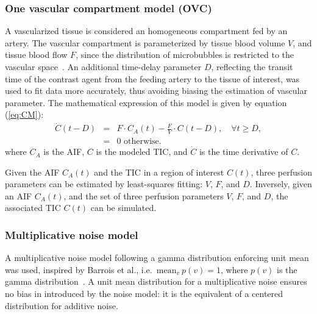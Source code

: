 \subsubsection{One vascular compartment model (OVC)}
\label{sec:OVCModel}
A vascularized tissue is considered an homogeneous compartment fed by an artery.
The vascular compartment is parameterized by tissue blood volume $V$, and tissue blood flow $F$, since the distribution of microbubbles is restricted to the vascular space~\cite{Gunn2001cx,Doury2016wn}.
An additional time-delay parameter $D$, reflecting the transit time of the contrast agent from the feeding artery to the tissue of interest, was used to fit data more accurately, thus avoiding biasing the estimation of vascular parameter. 
The mathematical expression of this model is given by equation (\ref{eq:CM}):
\begin{equation}
\begin{array}{rcl}
\dot{C} \left( t - D \right) &=& F \cdot C_A \left( t \right) - \frac{F}{V} \cdot C \left( t - D \right), \quad \forall t \geq D,  \\
 &=& 0 \textrm{ otherwise.}
\end{array}
\label{eq:CM}
\end{equation}
where $C_A$ is the AIF, $C$ is the modeled TIC, and $\dot{C}$ is the time derivative of $C$.

Given the AIF $C_A(t)$ and the TIC in a region of interest $C(t)$, three perfusion parameters can be estimated by least-squares fitting: $V$, $F$, and $D$.
Inversely, given an AIF $C_A(t)$, and the set of three perfusion parameters $V$, $F$, and $D$, the associated TIC $C(t)$ can be simulated.

\subsubsection{Multiplicative noise model}\label{sec:NoiseModel}
A multiplicative noise model following a gamma distribution enforcing unit mean was used, inspired by Barrois et al., i.e.~$\mathrm{mean}_v~p\left(v\right) = 1$, where $p\left(v\right)$ is the gamma distribution~\cite{Barrois2013}.
A unit mean distribution for a multiplicative noise ensures no bias in introduced by the noise model: it is the equivalent of a centered distribution for additive noise.

